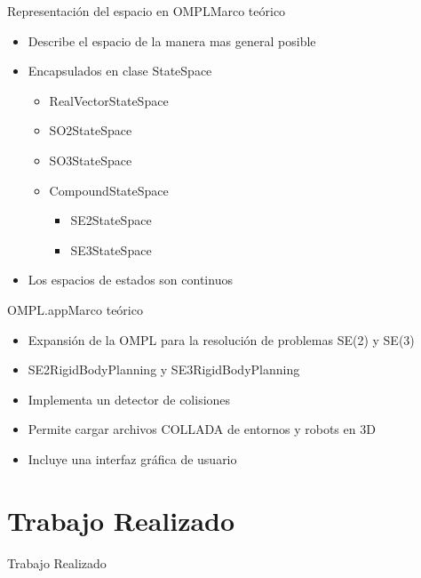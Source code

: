 \documentclass[10pt]{beamer}
\begin{document}
\begin{frame}{Representación del espacio en OMPL}{Marco teórico}
	\begin{itemize}
		\item Describe el espacio de la manera mas general posible
		
		\item Encapsulados en clase StateSpace
			\begin{itemize}
				
				\item RealVectorStateSpace
				\item SO2StateSpace
				\item SO3StateSpace
				\item CompoundStateSpace
				\begin{itemize}
					\item SE2StateSpace
					\item SE3StateSpace
				\end{itemize}
			\end{itemize}
		\item Los espacios de estados son continuos
	\end{itemize}
\end{frame}

\begin{frame}{OMPL.app}{Marco teórico}
	\begin{itemize}
		\item Expansión de la OMPL para la resolución de problemas SE(2) y SE(3)
		\item SE2RigidBodyPlanning y SE3RigidBodyPlanning
		\item Implementa un detector de colisiones
		\item Permite cargar archivos COLLADA de entornos y robots en 3D
		\item Incluye una interfaz gráfica de usuario	
		
	\end{itemize}
\end{frame}


\section{Trabajo Realizado}

\begin{frame}
\begin{center}
\vspace{1.5cm}
\huge Trabajo Realizado
\end{center}

\end{frame}
\end{document}
